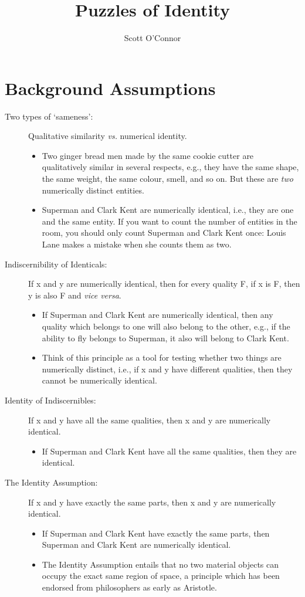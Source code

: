 \documentclass[9pt]{article}
\title{Puzzles of Identity}
\author{Scott O’Connor}
\begin{document}
\maketitle
\section{Background Assumptions}
\begin{description}
\item [Two types of `sameness':] Qualitative similarity \emph{vs.} numerical identity. 
\begin{itemize} 
\item Two ginger bread men made by the same cookie cutter are qualitatively similar in several respects, e.g., they have the same shape, the same weight, the same colour, smell, and so on. But these are \emph{two} numerically distinct entities. 
\item Superman and Clark Kent are numerically identical, i.e., they are one and the same entity. If you want to count the number of entities in the room, you should only count Superman and Clark Kent once: Louis Lane makes a mistake when she counts them as two. 
\end{itemize}
\item [Indiscernibility of Identicals:] If x and y are numerically identical, then for every quality F, if x is F, then y is also F and \emph{vice versa}.  
\begin{itemize}
\item If Superman and Clark Kent are numerically identical, then any quality which belongs to one will also belong to the other, e.g., if the ability to fly belongs to Superman, it also will belong to Clark Kent.
\item Think of this principle as a tool for testing whether two things are numerically distinct, i.e., if x and y have different qualities, then they cannot be numerically identical. 
\end{itemize}
\item [Identity of Indiscernibles:] If x and y have all the same qualities, then x and y are numerically identical. 
\begin{itemize}
\item If Superman and Clark Kent have all the same qualities, then they are identical. 
\end{itemize}
\item [The Identity Assumption:] If x and y have exactly the same parts, then x and y are numerically identical. 
\begin{itemize}
\item If Superman and Clark Kent have exactly the same parts,  then Superman and Clark Kent are numerically identical. 
\item The Identity Assumption entails that no two material objects can occupy the exact same region of space, a principle which has been endorsed from philosophers as early as Aristotle.  
\end{itemize}
\end{description}
\end{document}
